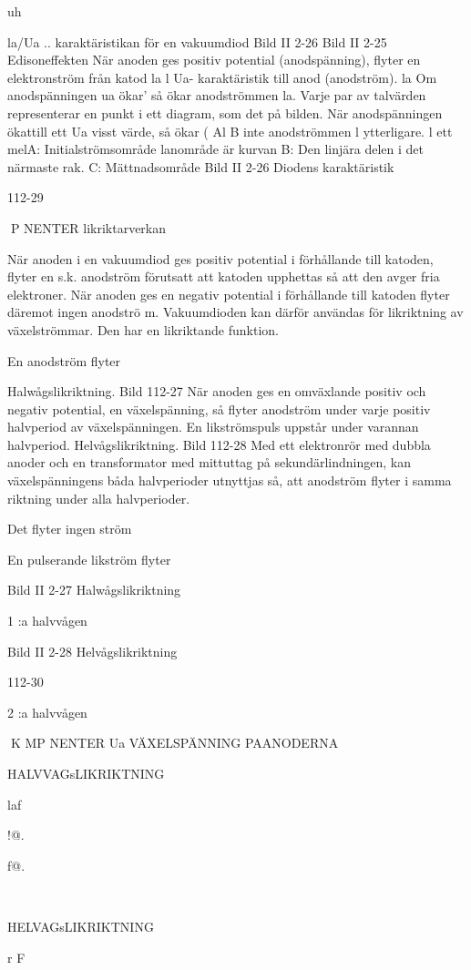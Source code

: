 {{uh

la/Ua .. karaktäristikan för en vakuumdiod
Bild II 2-26
Bild II 2-25 Edisoneffekten
När anoden ges positiv potential (anodspänning), flyter en elektronström från katod
la l Ua- karaktäristik
till anod (anodström).
la
Om anodspänningen
ua ökar' så ökar anodströmmen la. Varje
par av talvärden representerar en punkt
i ett diagram, som det
på bilden. När anodspänningen ökattill ett
Ua
visst värde, så ökar
(
Al B
inte anodströmmen
l
ytterligare.
l ett melA: Initialströmsområde
lanområde är kurvan
B: Den linjära delen
i det närmaste rak.
C: Mättnadsområde
Bild II 2-26 Diodens karaktäristik

112-29

P NENTER
likriktarverkan

När anoden i en vakuumdiod ges positiv
potential i förhållande till katoden, flyter en
s.k. anodström förutsatt att katoden upphettas så att den avger fria elektroner.
När anoden ges en negativ potential i
förhållande till katoden flyter däremot ingen
anodströ m.
Vakuumdioden kan därför användas för
likriktning av växelströmmar. Den har en
likriktande funktion.

En anodström flyter

Halwågslikriktning.
Bild 112-27
När anoden ges en omväxlande positiv och
negativ potential, en växelspänning, så flyter
anodström under varje positiv halvperiod av
växelspänningen. En likströmspuls uppstår
under varannan halvperiod.
Helvågslikriktning.
Bild 112-28
Med ett elektronrör med dubbla anoder och
en transformator med mittuttag på sekundärlindningen, kan växelspänningens båda
halvperioder utnyttjas så, att anodström flyter i samma riktning under alla halvperioder.

Det flyter ingen ström

En pulserande likström flyter

Bild II 2-27 Halwågslikriktning

1 :a halvvågen

Bild II 2-28 Helvågslikriktning

112-30

2 :a halvvågen

K MP NENTER
Ua
VÄXELSPÄNNING
PAANODERNA

HALVVAGsLIKRIKTNING

laf

!@.

f@.

~

HELVAGsLIKRIKTNING

r
F

}}
